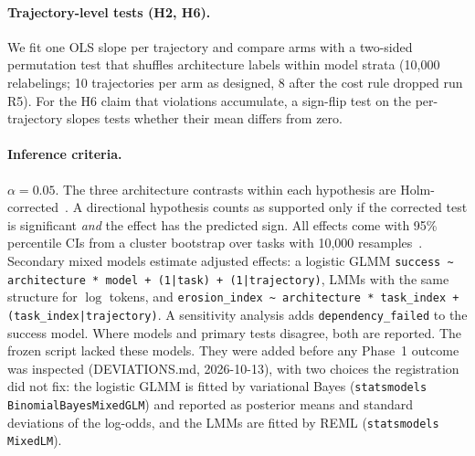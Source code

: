 \documentclass[10pt]{article}
\newcommand{\code}[1]{\texttt{#1}}
\begin{document}
\paragraph{Trajectory-level tests (H2, H6).} We fit one OLS slope per trajectory and compare arms with
a two-sided permutation test that shuffles architecture labels within model strata (10,000
relabelings; 10 trajectories per arm as designed, 8 after the cost rule dropped run R5). For the H6
claim that violations accumulate, a sign-flip test on the per-trajectory slopes tests whether their
mean differs from zero.

\paragraph{Inference criteria.} $\alpha=0.05$. The three architecture contrasts within each
hypothesis are Holm-corrected~\citep{holm1979simple}. A directional hypothesis counts as supported
only if the corrected test is significant \emph{and} the effect has the predicted sign. All effects
come with 95\% percentile CIs from a cluster bootstrap over tasks with 10,000
resamples~\citep{efron1993bootstrap}. Secondary mixed models estimate adjusted effects:
a logistic GLMM \code{success \textasciitilde{} architecture * model + (1|task) + (1|trajectory)},
LMMs with the same structure for $\log$ tokens, and \code{erosion\_index \textasciitilde{}
architecture * task\_index + (task\_index|trajectory)}. A sensitivity analysis adds
\code{dependency\_failed} to the success model. Where models and primary tests disagree, both are
reported. The frozen script lacked these models. They were added before any Phase~1 outcome was
inspected (DEVIATIONS.md, 2026-10-13), with two choices the registration did not fix: the
logistic GLMM is fitted by variational Bayes (\code{statsmodels} \code{BinomialBayesMixedGLM}) and
reported as posterior means and standard deviations of the log-odds, and the LMMs are fitted by
REML (\code{statsmodels} \code{MixedLM}).
\end{document}
